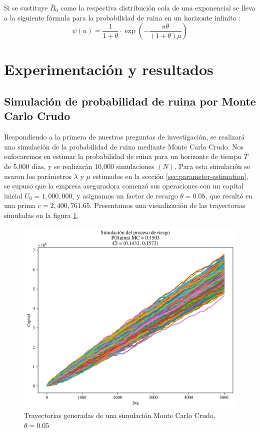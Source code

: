\documentclass[journal]{IEEEtran}
\begin{document}
            Si se sustituye $\bar{B}_0$ como la respectiva distribución cola de una exponencial se lleva a la siguiente fórmula para la probabilidad de ruina en un horizonte infinito \cite{josafat-santana-2020}:
            \begin{equation}\label{eqn:pollaczeck-prob}
                \psi(u) = \frac{1}{1+\theta} \cdot \exp\left(-\frac{u \theta}{(1+\theta)\mu}\right)
            \end{equation}

    \section{Experimentación y resultados} \label{sec:results}

        \subsection{Simulación de probabilidad de ruina por Monte Carlo Crudo} \label{sec:monte-carlo}

            Respondiendo a la primera de nuestras preguntas de investigación, se realizará una simulación de la probabilidad de ruina mediante Monte Carlo Crudo. Nos enfocaremos en estimar la probabilidad de ruina para un horizonte de tiempo $T$ de 5,000 días, y se realizarán 10,000 simulaciones $(N)$. Para esta simulación se usaron los parámetros $\lambda$ y $\mu$ estimados en la sección \ref{sec:parameter-estimation}, se supuso que la empresa aseguradora comenzó sus operaciones con un capital inicial $U_0 = 1,000,000$, y asignamos un factor de recargo $\theta = 0.05$, que resultó en una prima $c = 2,400,761.65$. Presentamos una visualización de las trayectorias simuladas en la figura \ref{fig:case-study-paths}.
            \begin{figure}[!htbp]
                \centering
                \includegraphics[scale=0.45]{img/ruin_sim_U01000000_T5000_Theta0.05_N10000.png}
                \caption{Trayectorias generadas de una simulación Monte Carlo Crudo, $\theta = 0.05$}
                \label{fig:case-study-paths}
            \end{figure}
            
\end{document}
